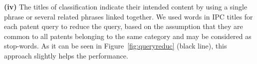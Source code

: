 \vspace*{0.5mm}
\noindent \textbf{(iv)} The titles of classification indicate their intended content by using a single phrase or several related phrases linked together. We used words in IPC titles for each patent query to reduce the query, based on the assumption that they are common to all patents belonging to the same category and may be considered as stop-words. As it can be seen in Figure~\ref{fig:queryreduc} (black line), this approach slightly helps the performance.
%
%
%

